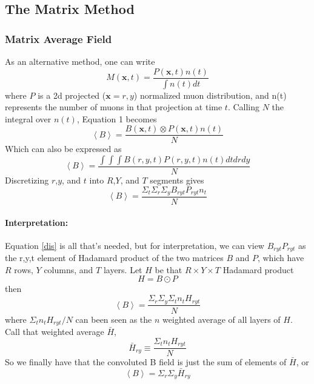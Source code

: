\documentclass[twoside]{article}
\begin{document}
\subsection{The Matrix Method}
\subsubsection{Matrix Average Field}
As an alternative method, one can write 
\begin{equation}
M(\textbf{x},t) = \frac{P(\textbf{x},t)n(t)}{\int n(t) dt} 
\end{equation}
where $P$ is a 2d projected ($\textbf{x}=r,y$) normalized muon distribution, and n(t) represents the number of muons in that projection at time $t$. Calling $N$ the integral over $n(t)$,  Equation 1 becomes
\begin{equation}
\left\langle B \right\rangle = \frac{B(\textbf{x},t) \otimes P(\textbf{x},t)n(t)}{N}
\end{equation}
Which can also be expressed as 
\begin{equation}
\left\langle B \right\rangle = \frac{\int \int \int  B(r,y,t) P(r,y,t)n(t)dtdrdy  }  {N}
\end{equation}
Discretizing $r$,$y$, and $t$ into $R$,$Y$, and $T$ segments gives
\begin{equation}
\label{dis}
\boxed{
\left\langle B \right\rangle = \frac{\Sigma_t \Sigma_r \Sigma_y    B_{ryt} P_{ryt}n_t }  {N}
}
\end{equation}

\paragraph{Interpretation:}
Equation \ref{dis}  is all that's needed, but for interpretation, we can view $B_{ryt} P_{ryt}$ as the {r,y,t} element of Hadamard product of the two matrices $B$ and $P$, which have $R$ rows, $Y$ columns, and $T$ layers. Let $H$ be that $R \times Y \times T$  Hadamard product
\begin{equation}
H = B \odot P
\end{equation}
then
\begin{equation}
\left\langle B \right\rangle = \frac{  \Sigma_r \Sigma_y \Sigma_t  n_t  H_{ryt} }  {N}
\end{equation}
where $\Sigma_t  n_t  H_{ryt}/N$ can been seen as the $n$ weighted average of all layers of $H$. Call that weighted average $\bar{H} $,
\begin{equation}
\bar{H}_{ry} \equiv \frac{ \Sigma_t  n_t  H_{ryt} }  {N}
\end{equation}
So we finally have that the convoluted B field is just the sum of elements of $\bar{H}$, or
\begin{equation}
\boxed{
\left\langle B \right\rangle =  \Sigma_r \Sigma_y \bar{H}_{ry}
}
\end{equation}
\end{document}
